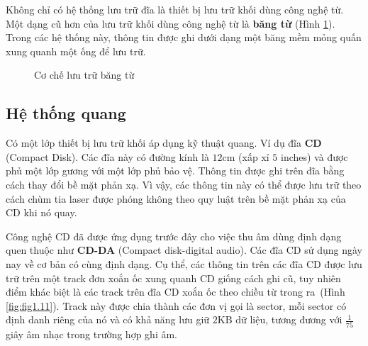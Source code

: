 Không chỉ có hệ thống lưu trữ đĩa là thiết bị lưu trữ khối dùng công nghệ từ. Một dạng cũ
hơn của lưu trữ khối dùng công nghệ từ là \textbf{băng từ} (Hình \ref{fig:fig1.10}). Trong
các hệ thống này, thông tin được ghi dưới dạng một băng mềm mỏng quấn xung quanh một ống
để lưu trữ.
 

\begin{figure}[bth]
  \centering {}
\caption{Cơ chế lưu trữ băng từ}
  \label{fig:fig1.10}
\end{figure}

\subsection*{Hệ thống quang}

Có một lớp thiết bị lưu trữ khối áp dụng kỹ thuật quang. Ví dụ đĩa \textbf{CD} (Compact
Disk). Các đĩa này có đường kính là $12$cm (xấp xỉ $5$ inches) và được phủ một lớp gương
với một lớp phủ bảo vệ. Thông tin được ghi trên đĩa bằng cách thay đổi bề mặt phản xạ. Vì
vậy, các thông tin này có thể được lưu trữ theo cách chùm tia laser được phóng không theo
quy luật trên bề mặt phản xạ của CD khi nó quay.

Công nghệ CD đã được ứng dụng trước đây cho việc thu âm dùng định dạng quen thuộc như
\textbf{CD-DA} (Compact disk-digital audio). Các đĩa CD sử dụng ngày nay về cơ bản có cùng
định dạng. Cụ thể, các thông tin trên các đĩa CD được lưu trữ trên một track đơn xoắn ốc
xung quanh CD giống cách ghi cũ, tuy nhiên điểm khác biệt là các track trên đĩa CD xoắn ốc
theo chiều từ trong ra~(Hình \ref{fig:fig1.11}). Track này được chia thành các đơn vị gọi
là sector, mỗi sector có định danh riêng của nó và có khả năng lưu giữ $2$KB dữ liệu,
tương đương với $\frac{1}{75}$ giây âm nhạc trong trường hợp ghi âm.
 
